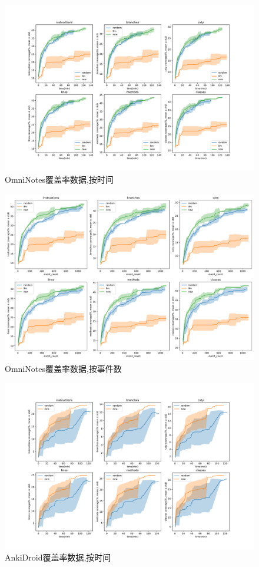 \documentclass{article}
\begin{document}
\begin{figure}[H]
\centering
\includegraphics[width=\textwidth]{res/it.feio.android.omninotes.alpha/coverage_time.pdf}
\caption{OmniNotes覆盖率数据,按时间}
\end{figure}

\begin{figure}[H]
\centering
\includegraphics[width=\textwidth]{res/it.feio.android.omninotes.alpha/coverage_event.pdf}
\caption{OmniNotes覆盖率数据,按事件数}
\end{figure}

\begin{figure}[H]
\centering
\includegraphics[width=\textwidth]{res/com.ichi2.anki.debug/coverage_time.pdf}
\caption{AnkiDroid覆盖率数据,按时间}
\end{figure}
\end{document}
